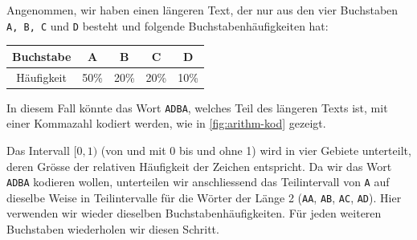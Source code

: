 \begin{myexample}\label{ex:arithm-adba}
Angenommen, wir haben einen längeren Text, der nur aus den vier Buchstaben \texttt{A, B, C} und \texttt{D} besteht und folgende Buchstabenhäufigkeiten hat:
\begin{table}[H]
	\centering
	\begin{tabular}{ccccc}
		Buchstabe  & A    & B    & C    & D    \\\midrule
		Häufigkeit & 50\% & 20\% & 20\% & 10\%
	\end{tabular}
\end{table}

In diesem Fall könnte das Wort \texttt{ADBA}, welches Teil des längeren Texts ist, mit einer Kommazahl kodiert werden, wie in \cref{fig:arithm-kod} gezeigt.

Das Intervall $[0, 1)$ (von und mit 0 bis und ohne 1) wird in vier Gebiete unterteilt, deren Grösse der relativen Häufigkeit der Zeichen entspricht. Da wir das Wort \texttt{ADBA} kodieren wollen, unterteilen wir anschliessend das Teilintervall von \texttt{A} auf dieselbe Weise in Teilintervalle für die Wörter der Länge 2 (\texttt{AA}, \texttt{AB}, \texttt{AC}, \texttt{AD}). Hier verwenden wir wieder dieselben Buchstabenhäufigkeiten. Für jeden weiteren Buchstaben wiederholen wir diesen Schritt.

\newcommand{\arithmeticTikz}[7]{
	\draw (0,#1) -- (10,#1);


	\foreach \i in {1,...,4}{
			\pgfmathsetmacro{\inc}{#2[\i-1]} %
			\pgfmathsetmacro{\xStart}{#3[\i-1]} %
			\pgfmathsetmacro{\xEnd}{\xStart+\inc} %
			\pgfmathsetmacro{\l}{#4[\i-1]} %

			\draw (\xStart*10,#1+0.2) to (\xStart*10,#1-0.2);
			\draw (\xEnd*10,#1+0.2) to (\xEnd*10,#1-0.2);

			\node (\l-Perc) at (\xStart*10,#1-0.4) {\fpeval{round(((1-\xStart)*#6+#7*\xStart),4)}};
			\node (\l-PercEnd) at (\xEnd*10,#1-0.4) {\fpeval{round(((1-\xEnd)*#6+#7*\xEnd),4)}};

}}
\end{myexample}
